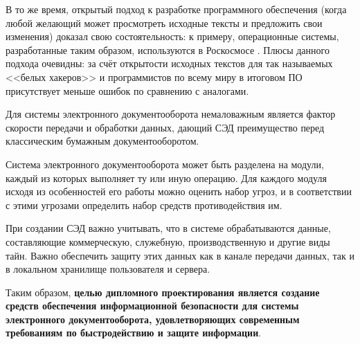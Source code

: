 \vspace{\baselineskip}
В то же время, открытый подход к разработке программного обеспечения (когда любой желающий может просмотреть исходные тексты и предложить свои изменения) доказал свою состоятельность: к примеру, операционные системы, разработанные таким образом, используются в Роскосмосе \cite{roskosmos}. Плюсы данного подхода очевидны: за счёт открытости исходных текстов для так называемых <<белых хакеров>> и программистов по всему миру в итоговом ПО присутствует меньше ошибок по сравнению с аналогами.

\vspace{\baselineskip}
Для системы электронного документооборота немаловажным является фактор скорости передачи и обработки данных, дающий СЭД преимущество перед классическим бумажным документооборотом.

\vspace{\baselineskip}
Система электронного документооборота может быть разделена на модули, каждый из которых выполняет ту или иную операцию. Для каждого модуля исходя из особенностей его работы можно оценить набор угроз, и в соответствии с этими угрозами определить набор средств противодействия им.

\vspace{\baselineskip}
При создании СЭД важно учитывать, что в системе обрабатываются данные, составляющие коммерческую, служебную, производственную и другие виды тайн. Важно обеспечить защиту этих данных как в канале передачи данных, так и в локальном хранилище пользователя и сервера.

\vspace{\baselineskip}
Таким образом, \textbf{целью дипломного проектирования является создание средств обеспечения информационной безопасности для системы электронного документооборота, удовлетворяющих современным требованиям по быстродействию и защите информации}.